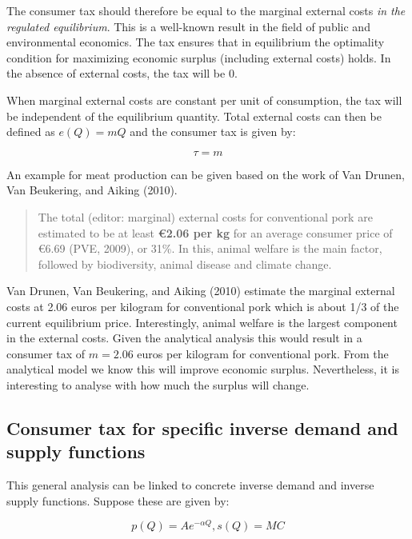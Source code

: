 \documentclass[
]{book}
\begin{document}
The consumer tax should therefore be equal to the marginal external costs \emph{in the regulated equilibrium}. This is a well-known result in the field of public and environmental economics. The tax ensures that in equilibrium the optimality condition for maximizing economic surplus (including external costs) holds. In the absence of external costs, the tax will be \(0\).

When marginal external costs are constant per unit of consumption, the tax will be independent of the equilibrium quantity. Total external costs can then be defined as \(e(Q)=mQ\) and the consumer tax is given by:

\begin{equation}
\tau = m
\end{equation}

An example for meat production can be given based on the work of Van Drunen, Van Beukering, and Aiking (2010).

\begin{quote}
The total (editor: marginal) external costs for conventional pork are estimated to be at least \textbf{€2.06 per kg} for an average consumer price of €6.69 (PVE, 2009), or 31\%. In this, animal welfare is the main factor, followed by biodiversity, animal disease and climate change.
\end{quote}

Van Drunen, Van Beukering, and Aiking (2010) estimate the marginal external costs at 2.06 euros per kilogram for conventional pork which is about 1/3 of the current equilibrium price. Interestingly, animal welfare is the largest component in the external costs. Given the analytical analysis this would result in a consumer tax of \(m=2.06\) euros per kilogram for conventional pork. From the analytical model we know this will improve economic surplus. Nevertheless, it is interesting to analyse with how much the surplus will change.

\hypertarget{consumer-tax-for-specific-inverse-demand-and-supply-functions}{%
\subsection{Consumer tax for specific inverse demand and supply functions}\label{consumer-tax-for-specific-inverse-demand-and-supply-functions}}

This general analysis can be linked to concrete inverse demand and inverse supply functions. Suppose these are given by:

\begin{equation}
p(Q) = A e^{-\alpha Q}, s(Q) = MC
\end{equation}
\end{document}
